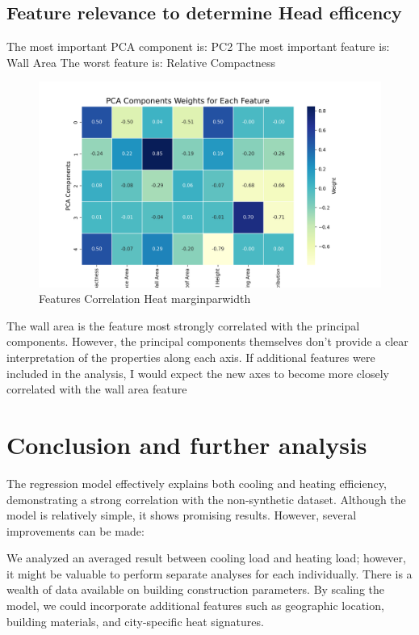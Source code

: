\documentclass{article}
\begin{document}
\subsection{Feature relevance to determine Head efficency}
The most important PCA component is: PC2
The most important feature is: Wall Area
The worst feature is: Relative Compactness

\begin{figure}[H]  
    \centering
    \includegraphics[width=1\linewidth]{PCAComponents.png}
    \caption{Features Correlation Heat marginparwidth}
    \vspace{-1em} %
    \end{figure}

The wall area is the feature most strongly correlated with the principal components.
However, the principal components themselves don’t provide a clear interpretation of the properties along each axis. 
If additional features were included in the analysis, I would expect the new axes to become more closely correlated 
with the wall area feature

\section{Conclusion and further analysis}

The regression model effectively explains both cooling and heating efficiency, demonstrating a strong correlation with the non-synthetic dataset. Although the model is relatively simple, it shows promising results. However, several improvements can be made:

We analyzed an averaged result between cooling load and heating load; however, it might be valuable to perform separate analyses for each individually.
There is a wealth of data available on building construction parameters. By scaling the model, we could incorporate additional features such as geographic location, building materials, and city-specific heat signatures.
\appendix


\label{sec:appendix}


\end{document}
